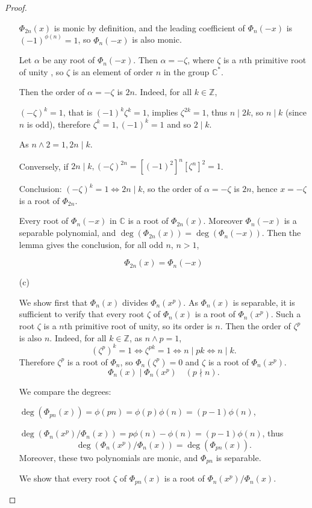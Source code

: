 \documentclass[11pt,a4paper]{article}
\newcommand{\Z}{\mathbb{Z}}
\newcommand{\C}{\mathbb{C}}
\begin{document}
\begin{proof}
\begin{enumerate}
$\Phi_{2n}(x)$ is monic by definition, and the leading coefficient of $\Phi_n(-x)$ is $(-1)^{\phi(n)} = 1$, so $\Phi_n(-x)$ is also monic.

Let $\alpha$ be any root of $\Phi_n(-x)$. Then $\alpha = -\zeta$, where $\zeta$ is a $n$th primitive root of unity , so $\zeta$ is an element of order $n$ in the group $\mathbb{C}^*$.

Then the order of $\alpha = -\zeta$ is $2n$. Indeed, for all $k \in \mathbb{Z}$,

$(-\zeta)^k = 1$, that is  $(-1)^k \zeta^k = 1$, implies $\zeta^{2k} = 1$, thus  $n \mid 2k$, so  $n \mid k$ (since $n$ is odd), therefore $\zeta^k = 1, (-1)^k = 1$ and so  $2\mid k$.

As $n \wedge 2 = 1, 2n \mid k$.

Conversely, if $2n \mid k, (-\zeta)^{2n} = [(-1)^2]^n [\zeta^n]^2 = 1$.

Conclusion: $(-\zeta)^k = 1 \iff 2n \mid k$, so the order of $\alpha = -\zeta$ is $2n$, hence $x = -\zeta$  is a root of $\Phi_{2n}$.

Every root of $\Phi_n(-x)$ in $\C$  is a root of $\Phi_{2n}(x)$. Moreover $\Phi_n(-x)$  is a separable polynomial, and $\deg(\Phi_{2n}(x)) = \deg(\Phi_n(-x))$.  Then the lemma gives the conclusion, for all odd $n$, $n>1$,

$$\Phi_{2n}(x) = \Phi_n(-x)$$

\item[(c)]

We show first that $\Phi_n(x)$ divides $\Phi_n(x^p)$. As $\Phi_n(x)$ is separable, it is sufficient to verify that every root $\zeta$ of $\Phi_n(x)$ is a root of $\Phi_n(x^p)$. Such a root   $\zeta$  is a $n$th primitive root of unity, so its order is $n$. Then the order of $\zeta^p$ is also $n$. Indeed, for all $k\in \Z$, as $n\wedge p = 1$,
$$(\zeta^p)^k=1 \iff \zeta^{pk} = 1 \iff n \mid pk \iff n \mid k.$$
Therefore $\zeta^p$ is a root of $\Phi_n$, so $\Phi_n(\zeta^p)=0$ and $\zeta$ is a root of $\Phi_n(x^p)$.
$$\Phi_n(x) \mid \Phi_n(x^p)\quad (p\nmid n).$$

We compare the degrees: 

$\deg(\Phi_{pn}(x)) = \phi(pn) =\phi(p)\phi(n) = (p-1)\phi(n)$,

$\deg(\Phi_n(x^p)/\Phi_n(x)) = p \phi(n) - \phi(n) = (p-1)\phi(n)$, 
thus
$$\deg(\Phi_n(x^p)/\Phi_n(x)) = \deg(\Phi_{pn}(x)).$$
Moreover, these two polynomials are monic, and $\Phi_{pn}$ is separable.

We show that every root $\zeta$ of $\Phi_{pn}(x)$ is a root of $\Phi_n(x^p)/\Phi_n(x)$.


\end{enumerate}
\end{proof}
\end{document}
